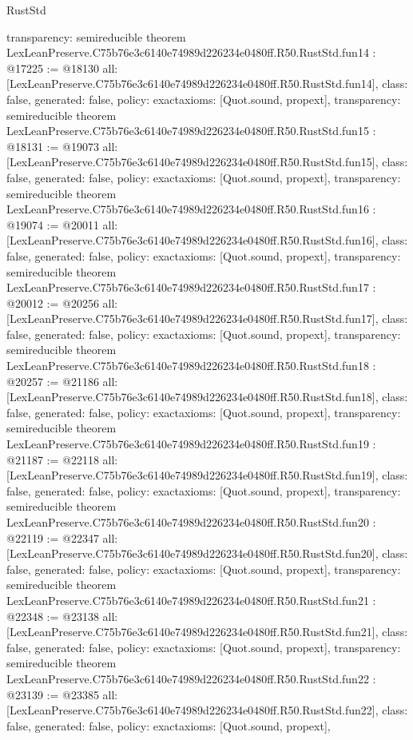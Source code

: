 \begin{lexlean}{RustStd}
\begin{coremodule}
{  transparency: semireducible
}
theorem LexLeanPreserve.C75b76e3c6140e74989d226234e0480ff.R50.RustStd.fun14 : @17225 := @18130 {
  all: [LexLeanPreserve.C75b76e3c6140e74989d226234e0480ff.R50.RustStd.fun14],
  class: false,
  generated: false,
  policy: exact{axioms: [Quot.sound, propext]},
  transparency: semireducible
}
theorem LexLeanPreserve.C75b76e3c6140e74989d226234e0480ff.R50.RustStd.fun15 : @18131 := @19073 {
  all: [LexLeanPreserve.C75b76e3c6140e74989d226234e0480ff.R50.RustStd.fun15],
  class: false,
  generated: false,
  policy: exact{axioms: [Quot.sound, propext]},
  transparency: semireducible
}
theorem LexLeanPreserve.C75b76e3c6140e74989d226234e0480ff.R50.RustStd.fun16 : @19074 := @20011 {
  all: [LexLeanPreserve.C75b76e3c6140e74989d226234e0480ff.R50.RustStd.fun16],
  class: false,
  generated: false,
  policy: exact{axioms: [Quot.sound, propext]},
  transparency: semireducible
}
theorem LexLeanPreserve.C75b76e3c6140e74989d226234e0480ff.R50.RustStd.fun17 : @20012 := @20256 {
  all: [LexLeanPreserve.C75b76e3c6140e74989d226234e0480ff.R50.RustStd.fun17],
  class: false,
  generated: false,
  policy: exact{axioms: [Quot.sound, propext]},
  transparency: semireducible
}
theorem LexLeanPreserve.C75b76e3c6140e74989d226234e0480ff.R50.RustStd.fun18 : @20257 := @21186 {
  all: [LexLeanPreserve.C75b76e3c6140e74989d226234e0480ff.R50.RustStd.fun18],
  class: false,
  generated: false,
  policy: exact{axioms: [Quot.sound, propext]},
  transparency: semireducible
}
theorem LexLeanPreserve.C75b76e3c6140e74989d226234e0480ff.R50.RustStd.fun19 : @21187 := @22118 {
  all: [LexLeanPreserve.C75b76e3c6140e74989d226234e0480ff.R50.RustStd.fun19],
  class: false,
  generated: false,
  policy: exact{axioms: [Quot.sound, propext]},
  transparency: semireducible
}
theorem LexLeanPreserve.C75b76e3c6140e74989d226234e0480ff.R50.RustStd.fun20 : @22119 := @22347 {
  all: [LexLeanPreserve.C75b76e3c6140e74989d226234e0480ff.R50.RustStd.fun20],
  class: false,
  generated: false,
  policy: exact{axioms: [Quot.sound, propext]},
  transparency: semireducible
}
theorem LexLeanPreserve.C75b76e3c6140e74989d226234e0480ff.R50.RustStd.fun21 : @22348 := @23138 {
  all: [LexLeanPreserve.C75b76e3c6140e74989d226234e0480ff.R50.RustStd.fun21],
  class: false,
  generated: false,
  policy: exact{axioms: [Quot.sound, propext]},
  transparency: semireducible
}
theorem LexLeanPreserve.C75b76e3c6140e74989d226234e0480ff.R50.RustStd.fun22 : @23139 := @23385 {
  all: [LexLeanPreserve.C75b76e3c6140e74989d226234e0480ff.R50.RustStd.fun22],
  class: false,
  generated: false,
  policy: exact{axioms: [Quot.sound, propext]},
}
\end{coremodule}
\end{lexlean}
